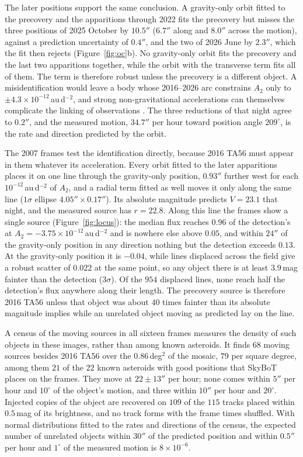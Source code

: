 \documentclass[3p,11pt]{elsarticle}
\begin{document}
The later positions support the same conclusion. A gravity-only orbit fitted to the
precovery and the apparitions through 2022 fits the precovery but misses the three
positions of 2025 October by $10.5''$ ($6.7''$ along and $8.0''$ across the motion),
against a prediction uncertainty of $0.4''$, and the two of 2026 June by $2.3''$, which
the fit then rejects (Figure~\ref{fig:oc}b). No gravity-only orbit fits the precovery and
the last two apparitions together, while the orbit with the transverse term fits all of
them. The term is therefore robust unless the precovery is a different object. A
misidentification would leave a body whose 2016--2026 arc constrains $A_2$ only to
$\pm4.3\times10^{-12}$\,au\,d$^{-2}$, and strong non-gravitational accelerations can
themselves complicate the linking of observations \citep{Taylor2024b}. The three
reductions of that night agree to $0.2''$, and the measured motion, $34.7''$ per hour
toward position angle $209^\circ$, is the rate and direction predicted by the orbit.

The 2007 frames test the identification directly, because 2016 TA56 must appear in them
whatever its acceleration. Every orbit fitted to the later apparitions places it on one
line through the gravity-only position, $0.93''$ further west for each $10^{-12}$\,au\,d$^{-2}$
of $A_2$, and a radial term fitted as well moves it only along the same line ($1\sigma$
ellipse $4.05''\times0.17''$). Its absolute magnitude predicts $V=23.1$ that night, and the
measured source has $r=22.8$.
Along this line the frames show a single source (Figure~\ref{fig:locus}): the median flux
reaches $0.96$ of the detection's at $A_2=-3.75\times10^{-12}$\,au\,d$^{-2}$ and is nowhere
else above $0.05$, and within $24''$ of the gravity-only position in any direction
nothing but the detection exceeds $0.13$. At the
gravity-only position it is $-0.04$, while lines displaced across the field give a robust
scatter of $0.022$ at the same point, so any object there is at least $3.9$\,mag
fainter than the detection ($3\sigma$). Of the $954$ displaced lines, none reach half the
detection's flux anywhere along their length. The precovery source is therefore
2016 TA56 unless that object was about $40$ times fainter than its absolute magnitude
implies while an unrelated object moving as predicted lay on the line.

A census of the moving sources in all sixteen frames measures the density of such objects
in these images, rather than among known asteroids. It finds $68$ moving sources besides
2016 TA56 over the $0.86$\,deg$^2$ of the mosaic, $79$ per square degree, among them
$21$ of the $22$ known asteroids with good positions that
SkyBoT \citep{Berthier2006} places on the frames. They move at $22\pm13''$ per hour; none
comes within $5''$ per hour and $10^\circ$ of the object's motion, and three within
$10''$ per hour and $20^\circ$. Injected copies of the object are recovered on $109$ of
the $115$ tracks placed within $0.5$\,mag of its brightness, and no track forms with
the frame times shuffled. With normal distributions fitted to the rates and directions of
the census, the expected number of unrelated objects within $30''$ of the predicted
position and within $0.5''$ per hour and $1^\circ$ of the measured motion is $8\times10^{-6}$.
\end{document}
